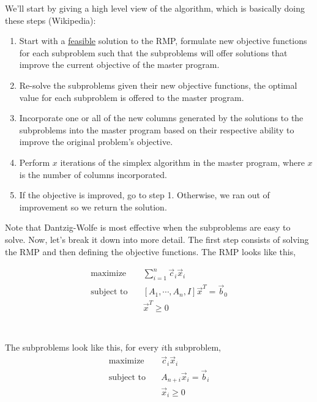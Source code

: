 \documentclass[11pt]{article}
\begin{document}
\noindent We'll start by giving a high level view of the algorithm, which is basically doing these steps (Wikipedia):
\begin{enumerate}
    \item Start with a \underline{feasible} solution to the RMP, formulate new objective functions for each subproblem such that the subproblems will offer solutions that improve the current objective of the master program.
    \item Re-solve the subproblems given their new objective functions, the optimal value for each subproblem is offered to the master program.
    \item Incorporate one or all of the new columns generated by the solutions to the subproblems into the master program based on their respective ability to improve the original problem's objective.
    \item Perform \(x\) iterations of the simplex algorithm in the master program, where \(x\) is the number of columns incorporated.
    \item If the objective is improved, go to step 1. Otherwise, we ran out of improvement so we return the solution.
\end{enumerate}

\noindent Note that Dantzig-Wolfe is most effective when the subproblems are easy to solve. Now, let's break it down into more detail.  The first step consists of solving the RMP and then defining the objective functions. The RMP looks like this,

$$
\begin{aligned}
    \text{maximize} \quad & \sum_{i=1}^{n} \vec{c}_i \vec{x}_i \\
    \text{subject to} \quad & [A_1, \cdots, A_n, I] \vec{x}^T = \vec{b}_0  \\
    & \vec{x}^T \geq 0\\
\end{aligned}
$$
\\
\\

\noindent The subproblems look like this, for every $i$th subproblem,
$$
\begin{aligned}
    \text{maximize} \quad & \vec{c}_i \vec{x}_i \\
    \text{subject to} \quad & A_{n+i} \vec{x}_i = \vec{b}_i \\
    & \vec{x}_i \geq 0
\end{aligned}
$$
\\
\end{document}
